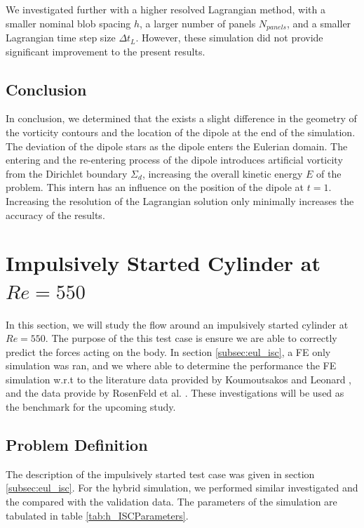 We investigated further with a higher resolved Lagrangian method, with a smaller nominal blob spacing $h$, a larger number of panels $N_{panels}$, and a smaller Lagrangian time step size $\Delta t_L$. However, these simulation did not provide significant improvement to the present results. 


\subsection{Conclusion}

In conclusion, we determined that the exists a slight difference in the geometry of the vorticity contours and the location of the dipole at the end of the simulation. The deviation of the dipole stars as the dipole enters the Eulerian domain. The entering and the re-entering process of the dipole introduces artificial vorticity from the Dirichlet boundary $\Sigma_d$, increasing the overall kinetic energy $E$ of the problem. This intern has an influence on the position of the dipole at $t=1$. Increasing the resolution of the Lagrangian solution only minimally increases the accuracy of the results. 


\section{Impulsively Started Cylinder at $Re=550$}
\label{sec:vvhm-isc}
In this section, we will study the flow around an impulsively started cylinder at $Re=550$. The purpose of the this test case is ensure we are able to correctly predict the forces acting on the body. In section \ref{subsec:eul_isc}, a FE only simulation was ran, and we where able to determine the performance the FE simulation w.r.t to the literature data provided by Koumoutsakos and Leonard \cite{Koumoutsakos1995a}, and the data provide by  RosenFeld et al. \cite{MosheRosenFeldDochanKwak1991}. These investigations will be used as the benchmark for the upcoming study.

\subsection{Problem Definition}

The description of the impulsively started test case was given in section \ref{subsec:eul_isc}. For the hybrid simulation, we performed similar investigated and the compared with the validation data. The parameters of the simulation are tabulated in table \ref{tab:h_ISCParameters}. 


